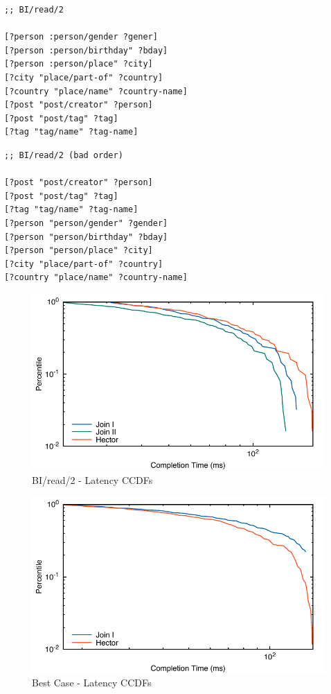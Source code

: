 \documentclass[../catalog.tex]{subfiles}
\begin{document}
\begin{verbatim}
;; BI/read/2

[?person :person/gender ?gener]
[?person :person/birthday" ?bday]
[?person :person/place" ?city]
[?city "place/part-of" ?country]
[?country "place/name" ?country-name]
[?post "post/creator" ?person]
[?post "post/tag" ?tag]
[?tag "tag/name" ?tag-name]
\end{verbatim}

\begin{verbatim}
;; BI/read/2 (bad order)

[?post "post/creator" ?person]
[?post "post/tag" ?tag]
[?tag "tag/name" ?tag-name]
[?person "person/gender" ?gender]
[?person "person/birthday" ?bday]
[?person "person/place" ?city]
[?city "place/part-of" ?country]
[?country "place/name" ?country-name]
\end{verbatim}

\begin{figure}[h!]
  \includegraphics[width=1.0\linewidth]{results/bi_read_2/out/all_cdfs}
  \caption{BI/read/2 - Latency CCDFs}
  \label{fig:average-cdfs}
\end{figure}

\begin{figure}[h!]
  \includegraphics[width=1.0\linewidth]{results/best_case/out/all_cdfs}
  \caption{Best Case - Latency CCDFs}
  \label{fig:best-case-cdfs}
\end{figure}
\end{document}
